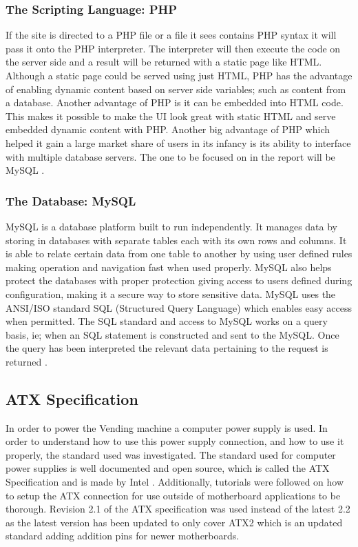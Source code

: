 \documentclass[a4paper,11pt]{article}
\numberwithin{figure}{section}
\numberwithin{table}{section}
\begin{document}
\subsubsection{The Scripting Language: PHP}
If the site is directed to a PHP file or a file it sees contains PHP syntax it will pass it onto the PHP interpreter. The interpreter will then execute the code on the server side and a result will be returned with a static page like HTML. Although a static page could be served using just HTML, PHP has the advantage of enabling dynamic content based on server side variables; such as content from a database. Another advantage of PHP is it can be embedded into HTML code. This makes it possible to make the UI look great with static HTML and serve embedded dynamic content with PHP. Another big advantage of PHP which helped it gain a large market share of users in its infancy is its ability to interface with multiple database servers. The one to be focused on in the report will be MySQL \cite{PHP}.


\subsubsection{The Database: MySQL}
MySQL is a database platform built to run independently. It manages data by storing in databases with separate tables each with its own rows and columns. It is able to relate certain data from one table to another by using user defined rules making operation and navigation fast when used properly. MySQL also helps protect the databases with proper protection giving access to users defined during configuration, making it a secure way to store sensitive data. MySQL uses the ANSI/ISO standard SQL (Structured Query Language) which enables easy access when permitted. The SQL standard and access to MySQL works on a query basis, ie; when an SQL statement is constructed and sent to the MySQL. Once the query has been interpreted the relevant data pertaining to the request is returned \cite{mysql}.  

\subsection{ATX Specification}
In order to power the Vending machine a computer power supply is used. In order to understand how to use this power supply connection, and how to use it properly, the standard used was investigated. The standard used for computer power supplies is well documented and open source, which is called the ATX Specification and is made by Intel \cite{ATX}. Additionally, tutorials were followed on how to setup the ATX connection for use outside of motherboard applications to be thorough. Revision 2.1 of the ATX specification was used instead of the latest 2.2 as the latest version has been updated to only cover ATX2 which is an updated standard adding addition pins for newer motherboards.
\end{document}
